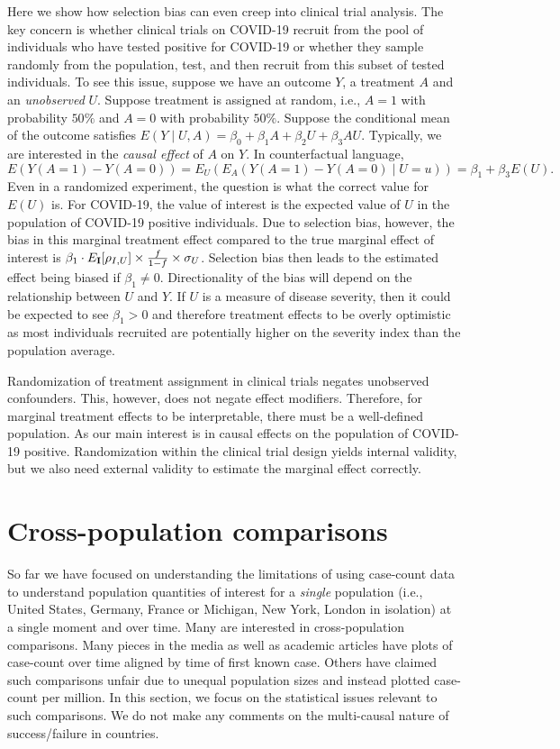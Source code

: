\documentclass[aoas]{amsart}
\def\I{\bf I}
\begin{document}
Here we show how selection bias can even creep into clinical trial analysis. The key concern is whether clinical trials on COVID-19 recruit from the pool of individuals who have tested positive for COVID-19 or whether they sample randomly from the population, test, and then recruit from this subset of tested individuals.  To see this issue, suppose we have an outcome $Y$, a treatment $A$ and an \emph{unobserved} $U$.  Suppose treatment is assigned at random, i.e., $A =1$ with probability $50\%$ and $A=0$ with probability $50\%$.  Suppose the conditional mean of the outcome satisfies  $E(Y \mid U, A ) = \beta_0 + \beta_1 A + \beta_2 U + \beta_3 A U$.  Typically, we are interested in the \emph{causal effect} of $A$ on $Y$.  In counterfactual language,
$$
E( Y(A=1) - Y(A=0) ) = E_U ( E_A ( Y(A=1) - Y(A=0) \mid U=u ))
= \beta_1 + \beta_3 E(U).
$$
Even in a randomized experiment, the question is what the correct value for $E(U)$ is. For COVID-19, the value of interest is the expected value of $U$ in the population of COVID-19 positive individuals.  Due to selection bias, however, the bias in this marginal treatment effect compared to the true marginal effect of interest is $\beta_1 \cdot E_{\I} [ \rho_{I,U} ] \times \frac{f}{1-f} \times \sigma_U$.  Selection bias then leads to the estimated effect being biased if $\beta_1 \neq 0$.  Directionality of the bias will depend on the relationship between $U$ and $Y$.  If $U$ is a measure of disease severity, then it could be expected to see $\beta_1 > 0$ and therefore treatment effects to be overly optimistic as most individuals recruited are potentially higher on the severity index than the population average.

Randomization of treatment assignment in clinical trials negates unobserved confounders.  This, however, does not negate effect modifiers.  Therefore, for marginal treatment effects to be interpretable, there must be a well-defined population.  As our main interest is in causal effects on the population of COVID-19 positive.  Randomization within the clinical trial design yields internal validity, but we also need external validity to estimate the marginal effect correctly.

\section{Cross-population comparisons}

So far we have focused on understanding the limitations of using case-count data to understand population quantities of interest for a \emph{single} population (i.e., United States, Germany, France or Michigan, New York, London in isolation) at a single moment and over time.  Many are interested in cross-population comparisons.  Many pieces in the media as well as academic articles have plots of case-count over time aligned by time of first known case.  Others have claimed such comparisons unfair due to unequal population sizes and instead plotted case-count per million.  In this section, we focus on the statistical issues relevant to such comparisons. We do not make any comments on the multi-causal nature of success/failure in countries.
\end{document}
